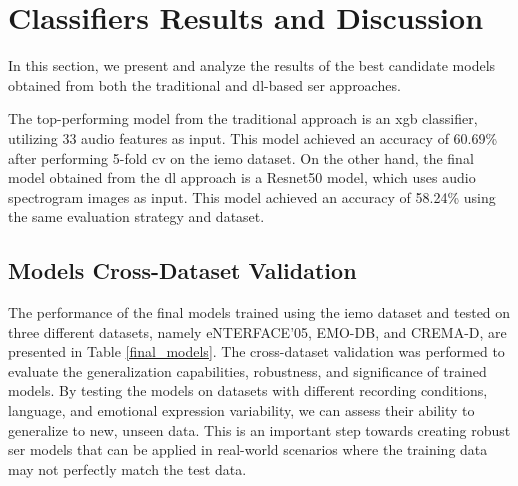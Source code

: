 \section{Classifiers Results and Discussion}

In this section, we present and analyze the results of the best candidate models obtained from both the traditional and \ac{dl}-based \ac{ser} approaches.

The top-performing model from the traditional approach is an \ac{xgb} classifier, utilizing 33 audio features as input. This model achieved an accuracy of 60.69\% after performing 5-fold \ac{cv} on the \ac{iemo} dataset. On the other hand, the final model obtained from the \ac{dl} approach is a Resnet50 model, which uses audio spectrogram images as input. This model achieved an accuracy of 58.24\% using the same evaluation strategy and dataset.


\subsection{Models Cross-Dataset Validation}

The performance of the final models trained using the \ac{iemo} dataset and tested on three different datasets, namely eNTERFACE'05, EMO-DB, and CREMA-D, are presented in Table \ref{final_models}. The cross-dataset validation was performed to evaluate the generalization capabilities, robustness, and significance of trained models. By testing the models on datasets with different recording conditions, language, and emotional expression variability, we can assess their ability to generalize to new, unseen data. This is an important step towards creating robust \ac{ser} models that can be applied in real-world scenarios where the training data may not perfectly match the test data.


